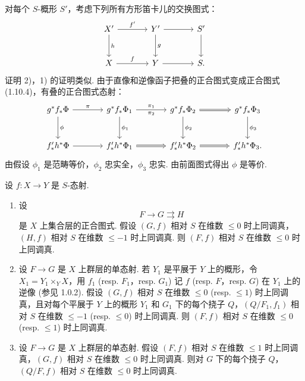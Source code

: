 对每个 $S$-概形 $S'$，考虑下列所有方形笛卡儿的交换图式：
\[
\begin{tikzcd}[row sep=large, column sep=large]
X' \arrow[r,"{f'}"] \arrow[d,"{h}"] & Y' \arrow[r] \arrow[d,"{g}"] & S' \arrow[d] \\
X \arrow[r,"{f}"] & Y \arrow[r] & S.
\end{tikzcd}
\]
证明 2)，1) 的证明类似. 由于直像和逆像函子把叠的正合图式变成正合图式 (1.10.4)，有叠的正合图式态射：
\[
\begin{tikzcd}[row sep=large, column sep=large]
g^{*} f_* \Phi \arrow[r,"{\pi}"] \arrow[d,"{\phi}"] & g^{*} f_* \Phi_1 \arrow[r,"{\pi_1}","{\pi_2}"'] \arrow[d,"{\phi_1}"] & g^{*} f_* \Phi_2 \arrow[r, Rightarrow] \arrow[d,"{\phi_2}"] & g^{*} f_* \Phi_3 \arrow[d,"{\phi_3}"] \\
f'_* h^{*} \Phi \arrow[r] & f'_* h^{*} \Phi_1 \arrow[r, Rightarrow] & f'_* h^{*} \Phi_2 \arrow[r, Rightarrow] & f'_* h^{*} \Phi_3.
\end{tikzcd}
\]
由假设 $\phi_1$ 是范畴等价，$\phi_2$ 忠实全，$\phi_3$ 忠实. 由前面图式得出 $\phi$ 是等价.

\begin{proposition}\label{prop:XIII.1.13}
设 $f \colon X \to Y$ 是 $S$-态射.
\begin{enumerate}[1)]
\item 设
\[
F \longrightarrow G \rightrightarrows H
\]
是 $X$ 上集合层的正合图式. 假设 $(G, f)$ 相对 $S$ 在维数 $\leqslant 0$ 时上同调真，$(H, f)$ 相对 $S$ 在维数 $\leqslant -1$ 时上同调真. 则 $(F, f)$ 相对 $S$ 在维数 $\leqslant 0$ 时上同调真.
\item 设 $F \to G$ 是 $X$ 上群层的单态射. 若 $Y_1$ 是平展于 $Y$ 上的概形，令 $X_1 = Y_1 \times_Y X$，用 $f_1$ (resp. $F_1$，resp. $G_1$) 记 $f$ (resp. $F$，resp. $G$) 在 $Y_1$ 上的逆像 (参见 1.0.2). 假设 $(G, f)$ 相对 $S$ 在维数 $\leqslant 0$ (resp. $\leqslant 1$) 时上同调真，且对每个平展于 $Y$ 上的概形 $Y_1$ 和 $G_1$ 下的每个挠子 $Q$，$(Q/F_1, f_1)$ 相对 $S$ 在维数 $\leqslant -1$ (resp. $\leqslant 0$) 时上同调真. 则 $(F, f)$ 相对 $S$ 在维数 $\leqslant 0$ (resp. $\leqslant 1$) 时上同调真.
\item 设 $F \to G$ 是 $X$ 上群层的单态射. 假设 $(F, f)$ 相对 $S$ 在维数 $\leqslant 1$ 时上同调真，$(G, f)$ 相对 $S$ 在维数 $\leqslant 0$ 时上同调真. 则对 $G$ 下的每个挠子 $Q$，$(Q/F, f)$ 相对 $S$ 在维数 $\leqslant 0$ 时上同调真.
\end{enumerate}
\end{proposition}

